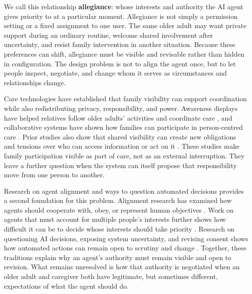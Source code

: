 We call this relationship \textbf{allegiance}: whose interests and authority the AI agent gives priority to at a particular moment. Allegiance is not simply a permission setting or a fixed assignment to one user. The same older adult may want private support during an ordinary routine, welcome shared involvement after uncertainty, and resist family intervention in another situation. Because these preferences can shift, allegiance must be visible and revisable rather than hidden in configuration. The design problem is not to align the agent once, but to let people inspect, negotiate, and change whom it serves as circumstances and relationships change.

Care technologies have established that family visibility can support coordination while also redistributing privacy, responsibility, and power. Awareness displays have helped relatives follow older adults' activities and coordinate care \cite{22,82,94}, and collaborative systems have shown how families can participate in person-centred care \cite{81}. Prior studies also show that shared visibility can create new obligations and tensions over who can access information or act on it \cite{24,111,115}. These studies make family participation visible as part of care, not as an external interruption. They leave a further question when the system can itself propose that responsibility move from one person to another.

Research on agent alignment and ways to question automated decisions provides a second foundation for this problem. Alignment research has examined how agents should cooperate with, obey, or represent human objectives \cite{32,38,79}. Work on agents that must account for multiple people's interests further shows how difficult it can be to decide whose interests should take priority \cite{62}. Research on questioning AI decisions, exposing system uncertainty, and revising consent shows how automated actions can remain open to scrutiny and change \cite{6,28,50,71}. Together, these traditions explain why an agent's authority must remain visible and open to revision. What remains unresolved is how that authority is negotiated when an older adult and caregiver both have legitimate, but sometimes different, expectations of what the agent should do.

